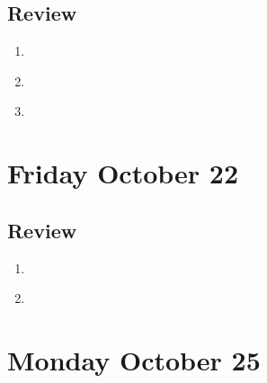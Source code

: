 \documentclass[12pt, oneside]{article}
\begin{document}
\subsection*{Review}
\begin{enumerate}
\item \hspace{1in}\\ 
\item \hspace{1in}\\ 
\item \hspace{1in}\\ 
\end{enumerate}

\newpage
\section*{Friday October 22}




\newpage


\newpage
\subsection*{Review}
\begin{enumerate}
\item \hspace{1in}\\
\item \hspace{1in}\\
\end{enumerate}


\section*{Monday October 25}
\end{document}
